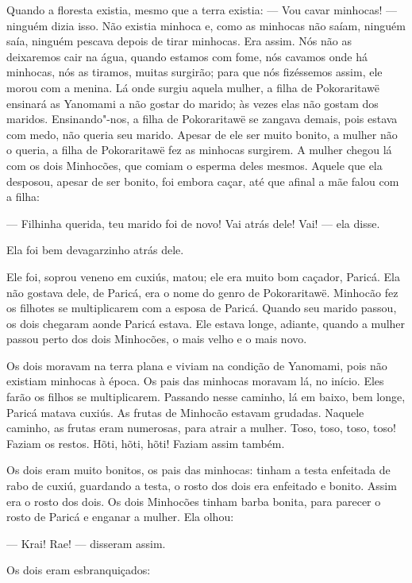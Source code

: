  

 Quando a floresta existia, mesmo que a terra
existia: 
--- Vou cavar minhocas! --- ninguém dizia isso. 
Não existia minhoca e, como as minhocas não saíam, ninguém saía, ninguém
pescava depois de tirar minhocas. Era assim. Nós não as deixaremos cair
na água, quando estamos com fome, nós cavamos onde há minhocas, nós as
tiramos, muitas surgirão; para que nós fizéssemos assim, ele morou com a
menina. Lá onde surgiu aquela mulher, a filha de Pokoraritawë ensinará
as Yanomami a não gostar do marido;  às vezes elas não gostam dos maridos. Ensinando"-nos, a filha de Pokoraritawë se zangava demais, pois
estava com medo, não queria seu marido. Apesar de ele ser muito bonito,
a mulher não o queria, a filha de Pokoraritawë fez as minhocas surgirem.
A mulher chegou lá com os dois Minhocões, que comiam o esperma deles
mesmos. Aquele que ela desposou, apesar de ser bonito, foi embora caçar,
até que afinal a mãe falou com a filha: 

--- Filhinha querida, teu marido foi de novo! Vai atrás dele! Vai! ---
ela disse. 

Ela foi bem devagarzinho atrás dele. 

Ele foi, soprou veneno em cuxiús, matou; ele era muito bom caçador,
Paricá. Ela não gostava dele, de Paricá, era o nome do genro de
Pokoraritawë. Minhocão fez os filhotes se multiplicarem com a esposa de
Paricá. Quando seu marido passou, os dois chegaram aonde Paricá estava.
Ele estava longe, adiante, quando a mulher passou perto dos dois
Minhocões, o mais velho e o mais novo. 

Os dois moravam na terra plana e viviam na condição de Yanomami, pois
não existiam minhocas à época. Os pais das minhocas moravam lá, no
início. Eles farão os filhos se multiplicarem. Passando nesse caminho, lá
em baixo, bem longe, Paricá matava cuxiús. As frutas de Minhocão estavam
grudadas. Naquele caminho, as frutas eram numerosas, para atrair a
mulher. Toso, toso, toso, toso! Faziam os restos. Hõti, hõti, hõti!
Faziam assim também. 

Os dois eram muito bonitos, os pais das minhocas: tinham a testa
enfeitada de rabo de cuxiú, guardando a testa, o rosto dos dois era
enfeitado e bonito. Assim era o rosto dos dois. Os dois Minhocões tinham
barba bonita, para parecer o rosto de Paricá e enganar a mulher. Ela
olhou: 

--- Krai! Rae! --- disseram assim. 

Os dois eram esbranquiçados: 

